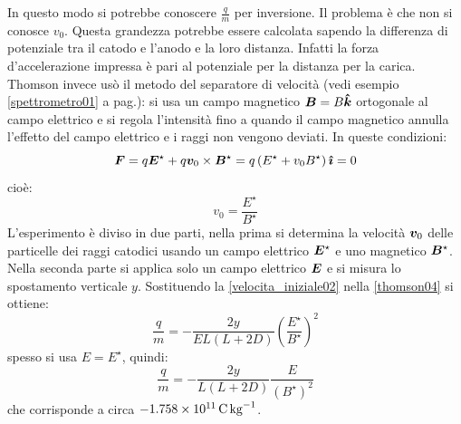 In questo modo si potrebbe conoscere $\frac{q}{m}$ per inversione. Il problema è che non si conosce $v_0$. Questa grandezza potrebbe essere calcolata sapendo la differenza di potenziale tra il catodo e l'anodo e la loro distanza. Infatti la forza d'accelerazione impressa è pari al potenziale per la distanza per la carica. Thomson invece usò il metodo del separatore di velocità (vedi esempio \ref{spettrometro01} a pag.\@ \pageref{spettrometro01}): si usa un campo magnetico $\boldsymbol{B}=B\boldsymbol{\hat {k}}$ ortogonale al campo elettrico e si regola l'intensità fino a quando il campo magnetico annulla l'effetto del campo elettrico e i raggi non vengono deviati. In queste condizioni:
\begin{equation}
	\boldsymbol{F}=q\boldsymbol{E}^\star+q\boldsymbol{v}_0\times\boldsymbol{B}^\star=q\left(E^\star+v_0 B^\star\right)\boldsymbol{\hat {\imath}}=0
\end{equation}
cioè:
\begin{equation}
	v_0=\frac{E^\star}{B^\star}
	\label{velocita_iniziale02}
\end{equation}
L'esperimento è diviso in due parti, nella prima si determina la velocità $\boldsymbol{v}_0$ delle particelle dei raggi catodici usando un campo elettrico $\boldsymbol{E}^\star$ e uno magnetico $\boldsymbol{B}^\star$. Nella seconda parte si applica solo un campo elettrico $\boldsymbol{E}$ e si misura lo spostamento verticale $y$. Sostituendo la \eqref{velocita_iniziale02} nella \eqref{thomson04} si ottiene:
\begin{equation}
	\frac{q}{m}=-\frac{2y}{EL(L+2D)}\left(\frac{E^\star}{B^\star}\right)^2
\end{equation}
spesso si usa $E=E^\star$, quindi:
\begin{equation}
	\frac{q}{m}=-\frac{2y}{L(L+2D)}\frac{E}{\left(B^\star\right)^2}
\end{equation}
che corrisponde a circa $-\SI{1.758E11}{\coulomb\per\kilogram}$.
